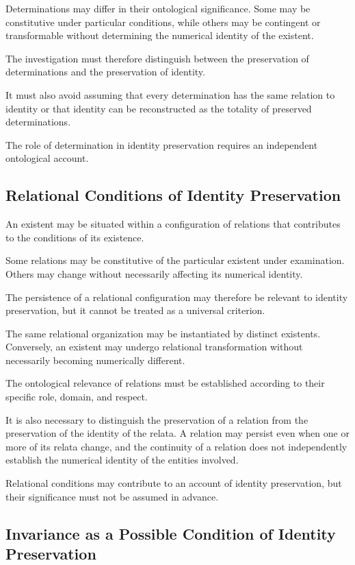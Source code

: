 Determinations may differ in their ontological
significance. Some may be constitutive under
particular conditions, while others may be contingent
or transformable without determining the numerical
identity of the existent.

The investigation must therefore distinguish
between the preservation of determinations and
the preservation of identity.

It must also avoid assuming that every determination
has the same relation to identity or that identity
can be reconstructed as the totality of preserved
determinations.

The role of determination in identity preservation
requires an independent ontological account.

\subsection{Relational Conditions of Identity Preservation}

An existent may be situated within a configuration
of relations that contributes to the conditions
of its existence.

Some relations may be constitutive of the particular
existent under examination. Others may change
without necessarily affecting its numerical identity.

The persistence of a relational configuration
may therefore be relevant to identity preservation,
but it cannot be treated as a universal criterion.

The same relational organization may be instantiated
by distinct existents. Conversely, an existent
may undergo relational transformation without
necessarily becoming numerically different.

The ontological relevance of relations must be
established according to their specific role,
domain, and respect.

It is also necessary to distinguish the preservation
of a relation from the preservation of the identity
of the relata. A relation may persist even when
one or more of its relata change, and the continuity
of a relation does not independently establish
the numerical identity of the entities involved.

Relational conditions may contribute to an account
of identity preservation, but their significance
must not be assumed in advance.

\subsection{Invariance as a Possible Condition of Identity Preservation}

